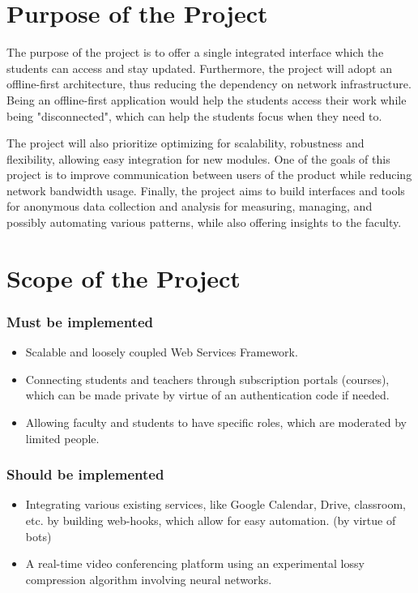 \section{Purpose of the Project}

The purpose of the project is to offer a single integrated interface which the students can access and stay updated.
Furthermore, the project will adopt an offline-first architecture, thus reducing the dependency on network infrastructure.
Being an offline-first application would help the students access their work while being "disconnected", which 
can help the students focus when they need to.

The project will also prioritize optimizing for scalability, robustness and flexibility, allowing easy integration 
for new modules. One of the goals of this project is to improve communication between users of the product while reducing 
network bandwidth usage.
Finally, the project aims to build interfaces and tools for anonymous data collection and analysis for measuring,
managing, and possibly automating various patterns, while also offering insights to the faculty.

\section{Scope of the Project}
\subsubsection{Must be implemented}
\begin{itemize}
    \item Scalable and loosely coupled Web Services Framework.
    \item Connecting students and teachers through subscription portals (courses), 
    which can be made private by virtue of an authentication code if needed.
    \item Allowing faculty and students to have specific roles, which are moderated by limited people.
\end{itemize}

\subsubsection{Should be implemented}
\begin{itemize}
    \item Integrating various existing services, like Google Calendar, Drive, classroom, etc. 
    by building web-hooks, which allow for easy automation. (by virtue of bots)
    \item A real-time video conferencing platform using an experimental lossy compression algorithm involving neural networks.
\end{itemize}

